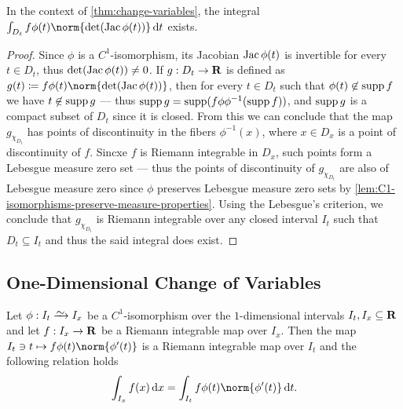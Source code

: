 \begin{corollary}
\label{cor:existence-right-int-change-variables}
In the context of \cref{thm:change-variables}, the integral \(\int_{D_t}
f\phi(t) \norm{\det(\Jac \phi(t))}\, \diff t\) exists.
\end{corollary}

\begin{proof}
Since \(\phi\) is a \(C^1\)-isomorphism, its Jacobian \(\operatorname{Jac} \phi(t)\) is invertible
for every \(t \in D_t\), thus \(\det(\operatorname{Jac} \phi(t)) \neq 0\). If \(g: D_t \to \mathbf{R}\)
is defined as \(g(t) \coloneq f \phi(t) \norm{\det(\Jac \phi(t))}\), then for
every \(t \in D_t\) such that \(\phi(t) \not\in \operatorname{supp} f\) we have \(t \not\in
\operatorname{supp} g\) --- thus \(\operatorname{supp} g = \operatorname{supp}(f \phi \phi^{-1}(\operatorname{supp} f))\), and \(\operatorname{supp}
g\) is a compact subset of \(D_t\) since it is closed. From this we can conclude
that the map \(g_{\chi_{D_t}}\) has points of discontinuity in the fibers
\(\phi^{-1}(x)\), where \(x \in D_x\) is a point of discontinuity of
\(f\). Sincxe \(f\) is Riemann integrable in \(D_x\), such points form a
Lebesgue measure zero set --- thus the points of discontinuity of
\(g_{\chi_{D_t}}\) are also of Lebesgue measure zero since \(\phi\) preserves
Lebesgue measure zero sets by
\cref{lem:C1-isomorphisms-preserve-measure-properties}. Using the Lebesgue's
criterion, we conclude that \(g_{\chi_{D_t}}\) is Riemann integrable over
any closed interval \(I_t\) such that \(D_t \subseteq I_t\) and thus the said
integral does exist.
\end{proof}

\subsection{One-Dimensional Change of Variables}

\begin{lemma}
\label{lem:change-variables-one-dimensional}
Let \(\phi: I_t \isoto I_x\) be a \(C^1\)-isomorphism over the \(1\)-dimensional
intervals \(I_t, I_x \subseteq \mathbf{R}\) and let \(f: I_x \to \mathbf{R}\) be a Riemann
integrable map over \(I_x\). Then the map \(I_t \ni t \mapsto f \phi(t)
\norm{\phi'(t)}\) is a Riemann integrable map over \(I_t\) and the following
relation holds
\[
  \int_{I_x} f(x)\, \diff x = \int_{I_t} f \phi(t) \norm{\phi'(t)}\, \diff t.
\]
\end{lemma}

